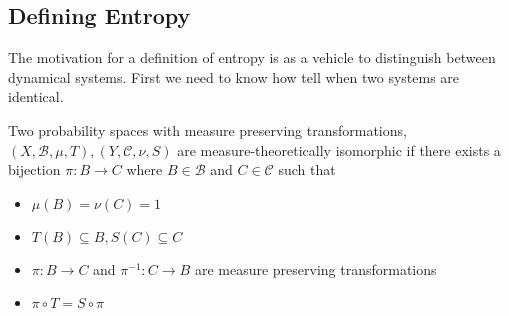 \documentclass[11pt]{article}
\newenvironment{defin}
	{\begin{mdframed}[backgroundcolor=white, roundcorner=5pt, linewidth=1pt, linecolor=RoyalBlue]}
	{\end{mdframed}}
\newcommand{\mdf}[1]{{\color{RoyalBlue} #1}}
\begin{document}
\subsection{Defining Entropy}
The motivation for a definition of entropy is as a vehicle to distinguish between dynamical systems. First we need to know how tell when two systems are identical.
\begin{defin}
	Two probability spaces with measure preserving transformations, $(X,\mathcal{B},\mu,T),(Y,\mathcal{C}, \nu, S)$ are \mdf{measure-theoretically isomorphic} if there exists a bijection $\pi:B\to C$ where $B\in\mathcal{B}$ and $C\in\mathcal{C}$ such that
	\begin{itemize}
		\item $\mu(B)=\nu(C)=1$
		\item $T(B)\subseteq B, S(C)\subseteq C$
		\item $\pi: B\to C$ and $\pi^{-1}:C\to B$ are measure preserving transformations
		\item $\pi\circ T = S\circ\pi$
		\begin{figure}[H]
			\centering
		\end{figure}	
	\end{itemize}
	

\end{defin}
\end{document}

